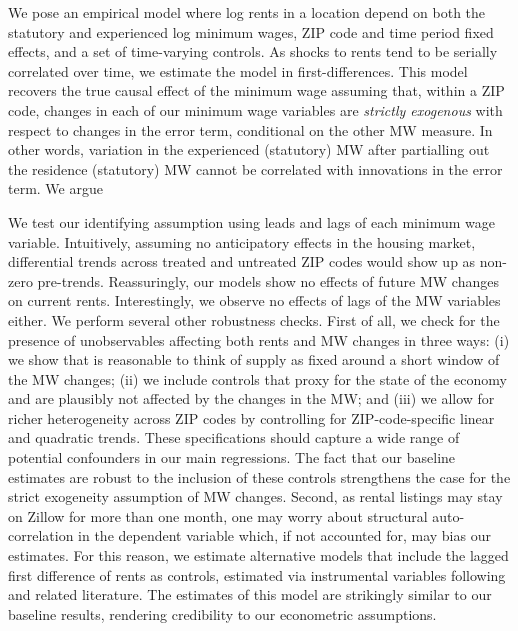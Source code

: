 
We pose an empirical model where log rents in a location depend on both the 
statutory and experienced log minimum wages, ZIP code and time period fixed effects,
and a set of time-varying controls.
As shocks to rents tend to be serially correlated over time, we estimate the model 
in first-differences.
This model recovers the true causal effect of the minimum wage assuming that, 
within a ZIP code, changes in each of our minimum wage variables are 
\textit{strictly exogenous} with respect to changes in the error term, conditional
on the other MW measure.
In other words, variation in the experienced (statutory) MW after partialling out 
the residence (statutory) MW cannot be correlated with innovations in the error 
term.
We argue 

We test our identifying assumption using leads and lags of each minimum wage variable.
Intuitively, assuming no anticipatory effects in the housing market, differential 
trends across treated and untreated ZIP codes would show up as non-zero pre-trends. 
Reassuringly, our models show no effects of future MW changes on current rents. 
Interestingly, we observe no effects of lags of the MW variables either.
We perform several other robustness checks.
First of all, we check for the presence of unobservables affecting both rents and MW 
changes in three ways:
(i) we show that is reasonable to think of supply as fixed around a short window of the 
MW changes;
(ii) we include controls that proxy for the state of the economy and are plausibly not 
affected by the changes in the MW; and (iii) we allow for richer heterogeneity across ZIP 
codes by controlling for ZIP-code-specific linear and quadratic trends.
These specifications should capture a wide range of potential confounders in our main 
regressions.
The fact that our baseline estimates are robust to the inclusion of these controls 
strengthens the case for the strict exogeneity assumption of MW changes.
Second, as rental listings may stay on Zillow for more than one month, one may worry 
about structural auto-correlation in the dependent variable which, if not accounted for, 
may bias our estimates.
For this reason, we estimate alternative models that include the lagged first difference 
of rents as controls, estimated via instrumental variables following 
\textcite{ArellanoBond1991} and related literature.
The estimates of this model are strikingly similar to our baseline results, rendering 
credibility to our econometric assumptions.

